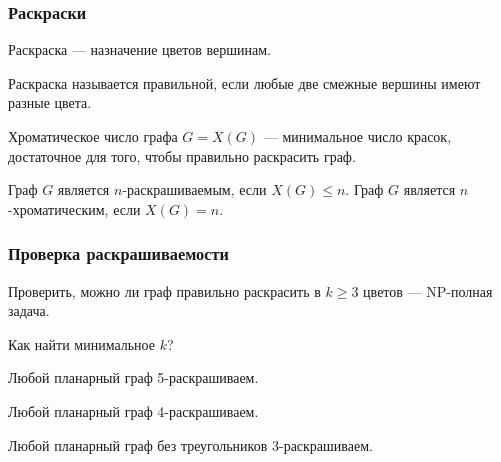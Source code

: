 \documentclass[xcolor=table]{beamer}
\begin{document}




\begin{frame} \frametitle{Раскраски}

\begin{definition}[Раскраска]
Раскраска --- назначение цветов вершинам.
\end{definition}
\pause

\begin{definition}
Раскраска называется правильной, если любые две смежные вершины имеют разные цвета.
\end{definition}
\pause

\begin{definition}
Хроматическое число графа $G = X(G)$ --- минимальное число красок, достаточное для того, чтобы правильно раскрасить граф.
\end{definition}
\pause

\begin{definition}
Граф $G$ является $n$-раскрашиваемым, если $X(G) \leq n$.
Граф $G$ является $n$-хроматическим, если $X(G) = n$.
\end{definition}

\end{frame}

\begin{frame} \frametitle{Проверка раскрашиваемости}

Проверить, можно ли граф правильно раскрасить в $k\geq 3$ цветов --- NP-полная задача.
\pause

Как найти минимальное $k$?

\pause

\begin{theorem}
Любой планарный граф 5-раскрашиваем.
\end{theorem}
\pause

\begin{theorem}
Любой планарный граф 4-раскрашиваем.
\end{theorem}
\pause

\begin{theorem}[Грёти]
Любой планарный граф без треугольников 3-раскрашиваем.
\end{theorem}

\end{frame}
\end{document}
